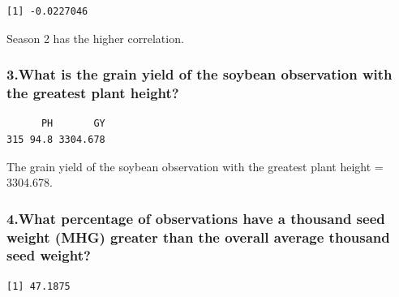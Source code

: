 \documentclass[
  letterpaper,
  DIV=11,
  numbers=noendperiod]{scrartcl}
\newenvironment{Shaded}{\begin{snugshade}}{\end{snugshade}}
\newcommand{\CommentTok}[1]{\textcolor[rgb]{0.37,0.37,0.37}{#1}}
\newcommand{\DecValTok}[1]{\textcolor[rgb]{0.68,0.00,0.00}{#1}}
\newcommand{\FunctionTok}[1]{\textcolor[rgb]{0.28,0.35,0.67}{#1}}
\newcommand{\NormalTok}[1]{\textcolor[rgb]{0.00,0.23,0.31}{#1}}
\newcommand{\OtherTok}[1]{\textcolor[rgb]{0.00,0.23,0.31}{#1}}
\newcommand{\SpecialCharTok}[1]{\textcolor[rgb]{0.37,0.37,0.37}{#1}}
\newcommand{\StringTok}[1]{\textcolor[rgb]{0.13,0.47,0.30}{#1}}
\begin{document}
\begin{verbatim}
[1] -0.0227046
\end{verbatim}

Season 2 has the higher correlation.

\subsubsection{3.What is the grain yield of the soybean observation with
the greatest plant
height?}\label{what-is-the-grain-yield-of-the-soybean-observation-with-the-greatest-plant-height}

\begin{Shaded}
\end{Shaded}

\begin{verbatim}
      PH       GY
315 94.8 3304.678
\end{verbatim}

The grain yield of the soybean observation with the greatest plant
height = 3304.678.

\subsubsection{4.What percentage of observations have a thousand seed
weight (MHG) greater than the overall average thousand seed
weight?}\label{what-percentage-of-observations-have-a-thousand-seed-weight-mhg-greater-than-the-overall-average-thousand-seed-weight}

\begin{Shaded}
\end{Shaded}

\begin{verbatim}
[1] 47.1875
\end{verbatim}
\end{document}
